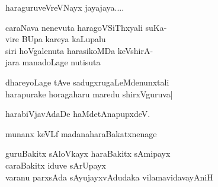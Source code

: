 \begin{entry}
\gl{}
\info{}{}{}{}
\end{entry}

\begin{entry}
\gl{}
\begin{shl}
haraguruveVreVNayx jayajaya....
\end{shl}
\end{entry}

\begin{entry}
\gl{}
\begin{shl}
caraNava nenevuta haragoVSiThxyali suKa-\\
vire BUpa kareya kaLupalu\\
siri hoVgalenuta harasikoMDa keVshirA-\\
jara manadoLage nutisuta
\end{shl}
\end{entry}

\begin{entry}
\begin{shl}
dhareyoLage tAve sadugxrugaLeMdenunxtali\\
harapurake horagaharu maredu shirxVguruva|
\end{shl}
\end{entry}

\begin{entry}
\gl{}
\begin{shl}
harabiVjavAdaDe haMdetAnapupxdeV.
\end{shl}
\end{entry}

\begin{entry}
\gl{}
\begin{shl}
munanx keVLf madanaharaBakatxnenage
\end{shl}
\end{entry}

\begin{entry}
\begin{shl}
guruBakitx sAloVkayx haraBakitx sAmipayx\\
caraBakitx iduve sArUpayx\\
varanu parxsAda sAyujayxvAdudaka vilamavidavayAniH
\end{shl}
\end{entry}

